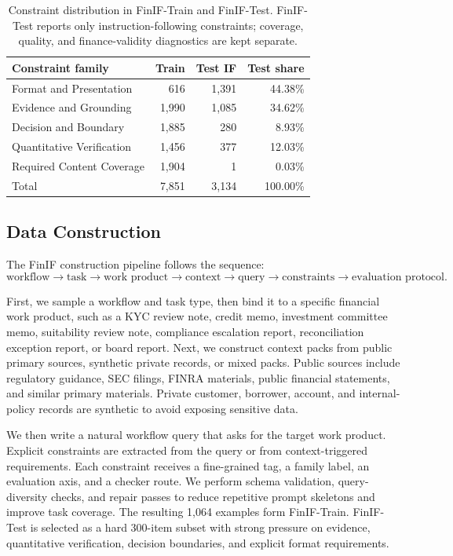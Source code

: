 \documentclass[11pt]{article}
\begin{document}
\begin{table}[t]
\centering
\small
\begin{tabular}{lrrr}
\toprule
Constraint family & Train & Test IF & Test share \\
\midrule
Format and Presentation & 616 & 1,391 & 44.38\% \\
Evidence and Grounding & 1,990 & 1,085 & 34.62\% \\
Decision and Boundary & 1,885 & 280 & 8.93\% \\
Quantitative Verification & 1,456 & 377 & 12.03\% \\
Required Content Coverage & 1,904 & 1 & 0.03\% \\
\midrule
Total & 7,851 & 3,134 & 100.00\% \\
\bottomrule
\end{tabular}
\caption{Constraint distribution in FinIF-Train and FinIF-Test. FinIF-Test reports only instruction-following constraints; coverage, quality, and finance-validity diagnostics are kept separate.}
\label{tab:constraints}
\end{table}

\subsection{Data Construction}

The FinIF construction pipeline follows the sequence:
\[
\text{workflow} \rightarrow \text{task} \rightarrow \text{work product} \rightarrow \text{context} \rightarrow \text{query} \rightarrow \text{constraints} \rightarrow \text{evaluation protocol}.
\]

First, we sample a workflow and task type, then bind it to a specific financial work product, such as a KYC review note, credit memo, investment committee memo, suitability review note, compliance escalation report, reconciliation exception report, or board report. Next, we construct context packs from public primary sources, synthetic private records, or mixed packs. Public sources include regulatory guidance, SEC filings, FINRA materials, public financial statements, and similar primary materials. Private customer, borrower, account, and internal-policy records are synthetic to avoid exposing sensitive data.

We then write a natural workflow query that asks for the target work product. Explicit constraints are extracted from the query or from context-triggered requirements. Each constraint receives a fine-grained tag, a family label, an evaluation axis, and a checker route. We perform schema validation, query-diversity checks, and repair passes to reduce repetitive prompt skeletons and improve task coverage. The resulting 1,064 examples form FinIF-Train. FinIF-Test is selected as a hard 300-item subset with strong pressure on evidence, quantitative verification, decision boundaries, and explicit format requirements.
\end{document}
